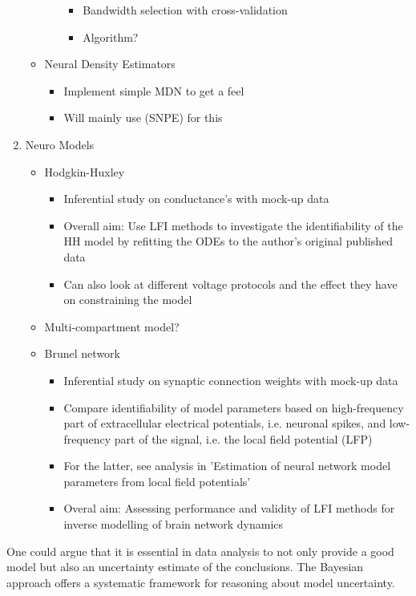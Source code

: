\begin{enumerate}
\begin{itemize}
\begin{itemize}
\begin{itemize}
                \item Bandwidth selection with cross-validation
                \item Algorithm?
            \end{itemize}
        \end{itemize}
        \item Neural Density Estimators
        \begin{itemize}
            \item Implement simple MDN to get a feel 
            \item Will mainly use  (SNPE) for this
        \end{itemize}
    \end{itemize}
    \item Neuro Models 
    \begin{itemize}
        \item Hodgkin-Huxley
        \begin{itemize}
            \item Inferential study on conductance's with mock-up data
            \item Overall aim: Use LFI methods to investigate the identifiability of the HH model by refitting the ODEs to the author's original published data
            \item Can also look at different voltage protocols and the effect they have on constraining the model 
        \end{itemize}
        \item Multi-compartment model? 
        \item Brunel network 
        \begin{itemize}
            \item Inferential study on synaptic connection weights with mock-up data
            \item Compare identifiability of model parameters based on high-frequency part of extracellular electrical potentials, i.e. neuronal spikes, and low-frequency part of the signal, i.e. the local field potential (LFP)
             \item For the latter, see analysis in 'Estimation of neural network model parameters from local field potentials'
             \item Overal aim: Assessing performance and validity of LFI methods for inverse modelling of brain network dynamics
        \end{itemize}
    \end{itemize}
\end{enumerate}


One could argue that it is essential in data analysis to not only provide a good model but also an uncertainty estimate of the conclusions. The Bayesian approach offers a systematic framework for reasoning about model uncertainty. 